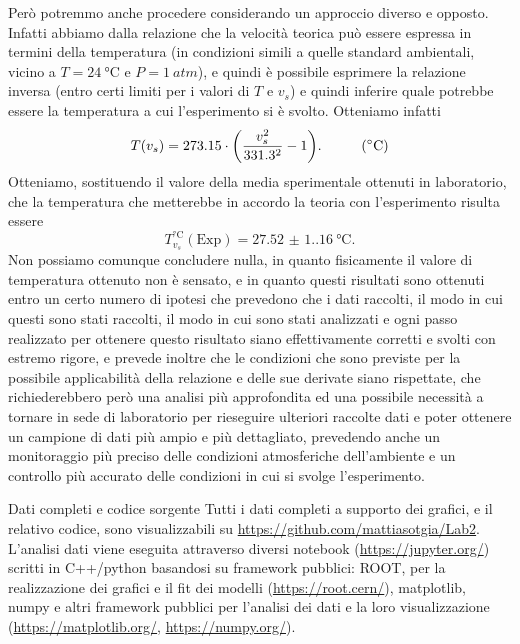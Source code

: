 \documentclass[
    prl,
    reprint, 
    superscriptaddress, 
    altaffilletter, 
    amsmath, 
    amssymb, 
    a4paper,
    varvw]{revtex4-2}
\begin{document}
Però potremmo anche procedere considerando un approccio diverso e opposto. Infatti abbiamo dalla relazione  che la velocità teorica può essere espressa in termini della temperatura (in condizioni simili a quelle standard ambientali, vicino a $T=\SI{24}{\celsius}$ e $P=\SI{1}{atm}$), e quindi è possibile esprimere la relazione inversa (entro certi limiti per i valori di $T$ e $v_s$) e quindi inferire quale potrebbe essere la temperatura a cui l'esperimento si è svolto. Otteniamo infatti \begin{equation}
    T(v_s) = 273.15\cdot\qty(\frac{v_s^2}{331.3^2}-1).\hspace{1cm}(\si{\celsius})
\end{equation}
Otteniamo, sostituendo il valore della media sperimentale ottenuti in laboratorio, che la temperatura che metterebbe in accordo la teoria con l'esperimento risulta essere \[T_{v_s}^{\si{\celsius}} (\text{Exp}) = \SI{27.52(1.16)}{\celsius}.\] Non possiamo comunque concludere nulla, in quanto fisicamente il valore di temperatura ottenuto non è sensato, e in quanto questi risultati sono ottenuti entro un certo numero di ipotesi che prevedono che i dati raccolti, il modo in cui questi sono stati raccolti, il modo in cui sono stati analizzati e ogni passo realizzato per ottenere questo risultato siano effettivamente corretti e svolti con estremo rigore, e prevede inoltre che le condizioni che sono previste per la possibile applicabilità della relazione  e delle sue derivate siano rispettate, che richiederebbero però una analisi più approfondita ed una possibile necessità a tornare in sede di laboratorio per rieseguire ulteriori raccolte dati e poter ottenere un campione di dati più ampio e più dettagliato, prevedendo anche un monitoraggio più preciso delle condizioni atmosferiche dell'ambiente e un controllo più accurato delle condizioni in cui si svolge l'esperimento.


\begin{methods}{D\lowercase{ati completi e codice sorgente}}
    Tutti i dati completi a supporto dei grafici, e il relativo codice, sono visualizzabili su \url{https://github.com/mattiasotgia/Lab2}. L'analisi dati viene eseguita attraverso diversi notebook (\url{https://jupyter.org/}) scritti in C++/python basandosi su framework pubblici: ROOT, per la realizzazione dei grafici e il fit dei modelli (\url{https://root.cern/}), matplotlib, numpy e altri framework pubblici per l'analisi dei dati e la loro visualizzazione (\url{https://matplotlib.org/}, \url{https://numpy.org/}).
\end{methods}
\end{document}
